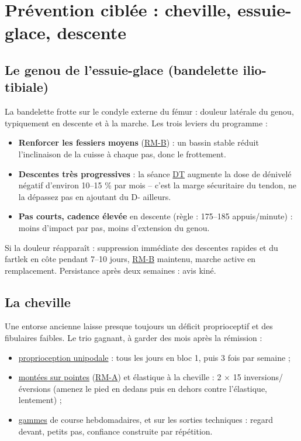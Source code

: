 \documentclass[10pt,a4paper]{article}
\newcommand{\key}[1]{\textbf{\sffamily\small\color{acc}#1}}
\newcommand{\exlk}[2]{\hyperlink{#1}{#2}}
\newcommand{\rma}{\hyperlink{rm-a}{RM-A}}
\newcommand{\rmb}{\hyperlink{rm-b}{RM-B}}
\newcommand{\dtl}{\hyperlink{dt}{DT}}
\newcommand{\gam}{\hyperlink{gammes}{gammes}}
\begin{document}
\section{Pr\'evention cibl\'ee : cheville, essuie-glace, descente}\label{sec:prevention}

\subsection{Le genou de l'essuie-glace (bandelette ilio-tibiale)}
La bandelette frotte sur le condyle externe du f\'emur : douleur lat\'erale
du genou, typiquement en descente et \`a la marche. Les trois leviers du
programme :
\begin{itemize}
\item \key{Renforcer les fessiers moyens} (\rmb{}) : un bassin stable r\'eduit
l'inclinaison de la cuisse \`a chaque pas, donc le frottement.
\item \key{Descentes tr\`es progressives} : la s\'eance \dtl{} augmente la dose
de d\'enivel\'e n\'egatif d'environ 10--15 \% par mois -- c'est la marge
s\'ecuritaire du tendon, ne la d\'epassez pas en ajoutant du D- ailleurs.
\item \key{Pas courts, cadence \'elev\'ee} en descente (r\`egle : 175--185
appuis/minute) : moins d'impact par pas, moins d'extension du genou.
\end{itemize}
Si la douleur r\'eappara\^it : suppression imm\'ediate des descentes rapides
et du fartlek en c\^ote pendant 7--10 jours, \rmb{} maintenu, marche active
en remplacement. Persistance apr\`es deux semaines : avis kin\'e.

\subsection{La cheville}
Une entorse ancienne laisse presque toujours un d\'eficit proprioceptif et
des fibulaires faibles. Le trio gagnant, \`a garder des mois apr\`es la
r\'emission :
\begin{itemize}
\item \exlk{proprio}{proprioception unipodale} : tous les jours en bloc 1,
puis 3 fois par semaine ;
\item \exlk{mollets}{mont\'ees sur pointes} (\rma{}) et \'elastique \`a la
cheville : 2 $\times$ 15 inversions/\'eversions (amenez le pied en dedans puis
en dehors contre l'\'elastique, lentement) ;
\item \gam{} de course hebdomadaires, et sur les sorties techniques :
regard devant, petits pas, confiance construite par r\'ep\'etition.
\end{itemize}
\end{document}
